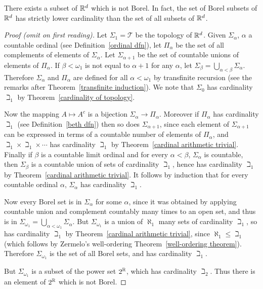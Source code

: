 \begin{lemma}\label{Borel sigma algebra}
There exists a subset of $\mathbb{R}^{d}$ which is not Borel.
In fact, the set of Borel subsets of $\mathbb{R}^{d}$ has strictly lower cardinality than the set of all subsets of $\mathbb{R}^{d}$.
\end{lemma}
\begin{proof}[Proof (omit on first reading)]
Let $\Sigma_{1} = \mathcal T$ be the topology of $\mathbb{R}^{d}$.
Given $\Sigma_{\alpha}$, $\alpha$ a countable ordinal (see Definition~\ref{ordinal dfn}), let $\Pi_{\alpha}$ be the set of all complements of elements of $\Sigma_{\alpha}$.
Let $\Sigma_{\alpha+1}$ be the set of countable unions of elements of $\Pi_{\alpha}$.
If $\beta < \omega_{1}$ is not equal to $\alpha+1$ for any $\alpha$, let $\Sigma_{\beta} = \bigcup_{\alpha < \beta} \Sigma_{\alpha}$.
Therefore $\Sigma_{\alpha}$ and $\Pi_{\alpha}$ are defined for all $\alpha < \omega_{1}$ by transfinite recursion (see the remarks after Theorem~\ref{transfinite induction}).
We note that $\Sigma_{0}$ has cardinality $\beth_{1}$ by Theorem~\ref{cardinality of topology}.

Now the mapping $A \mapsto A^{c}$ is a bijection $\Sigma_{\alpha} \to \Pi_{\alpha}$.
Moreover if $\Pi_{\alpha}$ has cardinality $\beth_{1}$ (see Definition~\ref{beth dfn}) then so does $\Sigma_{\alpha+1}$, since each element of $\Sigma_{\alpha+1}$ can be expressed in terms of a countable number of elements of $\Pi_{\alpha}$, and $\beth_{1} \times \beth_{1} \times \cdots$ has cardinality $\beth_{1}$ by Theorem~\ref{cardinal arithmetic trivial}.
Finally if $\beta$ is a countable limit ordinal and for every $\alpha < \beta$, $\Sigma_{\alpha}$ is countable, then $\Sigma_{\beta}$ is a countable union of sets of cardinality $\beth_{1}$, hence has cardinality $\beth_{1}$ by Theorem~\ref{cardinal arithmetic trivial}.
It follows by induction that for every countable ordinal $\alpha$, $\Sigma_{\alpha}$ has cardinality $\beth_{1}$.

Now every Borel set is in $\Sigma_{\alpha}$ for some $\alpha$, since it was obtained by applying countable union and complement countably many times to an open set, and thus is in $\Sigma_{\omega_{1}} = \bigcup_{\alpha < \omega_{1}} \Sigma_{\alpha}$.
But $\Sigma_{\omega_{1}}$ is a union of $\aleph_{1}$ many sets of cardinality $\beth_{1}$, so has cardinality $\beth_{1}$ by Theorem~\ref{cardinal arithmetic trivial},
since $\aleph_{1} \leq \beth_{1}$ (which follows by Zermelo's well-ordering Theorem~\ref{well-ordering theorem}).
Therefore $\Sigma_{\omega_{1}}$ is the set of all Borel sets, and has cardinality $\beth_{1}$.

But $\Sigma_{\omega_{1}}$ is a subset of the power set $2^{\mathbb{R}}$, which has cardinality $\beth_{2}$. Thus there is an element of $2^{\mathbb{R}}$ which is not Borel.
\end{proof}

